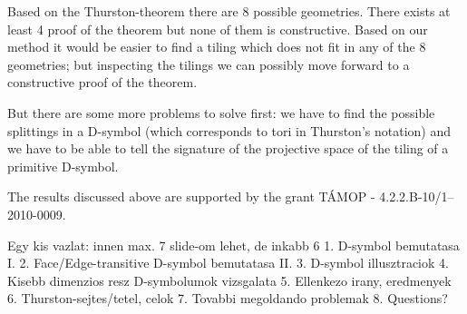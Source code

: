\begin{frame}
Based on the Thurston-theorem there are 8 possible geometries.  There exists at
least 4 proof of the theorem but none of them is constructive. Based on our
method it would be easier to find a tiling which does not fit in any of the 8
geometries; but inspecting the tilings we can possibly move forward to a
constructive proof of the theorem.
\vfill

But there are some more problems to solve first: we have to find the possible
splittings in a D-symbol (which corresponds to tori in Thurston's notation)
and we have to be able to tell the signature of the projective space of the
tiling of a primitive D-symbol.
\vfill

The results discussed above are supported by the grant TÁMOP -
4.2.2.B-10/1--2010-0009.

\end{frame}

Egy kis vazlat:
innen max. 7 slide-om lehet, de inkabb 6
1. D-symbol bemutatasa I.
2. Face/Edge-transitive D-symbol bemutatasa II.
3. D-symbol illusztraciok
4. Kisebb dimenzios resz D-symbolumok vizsgalata
5. Ellenkezo irany, eredmenyek
6. Thurston-sejtes/tetel, celok
7. Tovabbi megoldando problemak
8. Questions?

